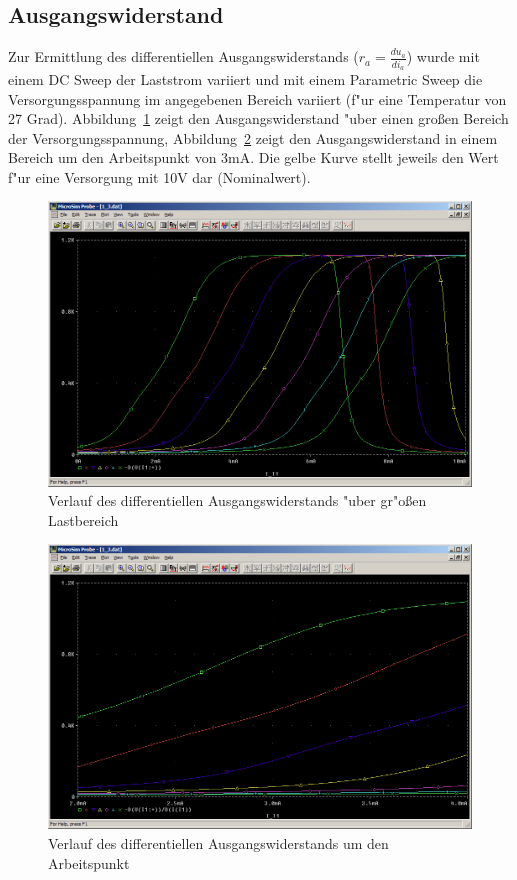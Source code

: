 \subsection{Ausgangswiderstand}

Zur Ermittlung des differentiellen Ausgangswiderstands ($r_a = \frac{du_a}{di_a}$) wurde mit einem DC Sweep der Laststrom variiert und mit einem Parametric Sweep die Versorgungsspannung im angegebenen Bereich variiert (f"ur eine Temperatur von 27 Grad). Abbildung~\ref{fig:3_1_3_ra} zeigt den Ausgangswiderstand "uber einen gro\ss{}en Bereich der Versorgungsspannung, Abbildung~\ref{fig:3_1_3_radetail} zeigt den Ausgangswiderstand in einem Bereich um den Arbeitspunkt von 3mA. Die gelbe Kurve stellt jeweils den Wert f"ur eine Versorgung mit 10V dar (Nominalwert).

\begin{figure}%
	\centering
	\includegraphics[width=\textwidth]{fig/bsp1/3_1_3_ra.PNG}
	\caption{Verlauf des differentiellen Ausgangswiderstands "uber gr"o\ss{}en Lastbereich}
	\label{fig:3_1_3_ra}
\end{figure}

\begin{figure}%
	\centering
	\includegraphics[width=\textwidth]{fig/bsp1/3_1_3_radetail.PNG}
	\caption{Verlauf des differentiellen Ausgangswiderstands um den Arbeitspunkt}
	\label{fig:3_1_3_radetail}
\end{figure}




